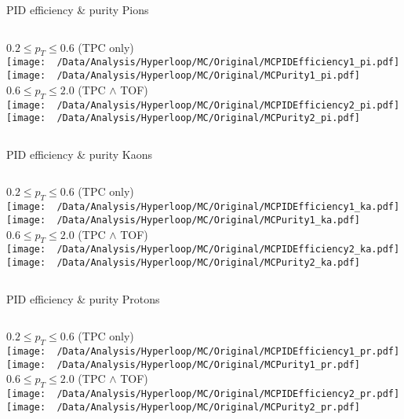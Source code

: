 \documentclass{beamer}
\begin{document}
\begin{frame}{PID efficiency \& purity}
	Pions\\
	\tiny
	\begin{columns}
		\centering
		$0.2\leq p_T \leq 0.6$ (TPC only)\\
		\texttt{[image: ~/Data/Analysis/Hyperloop/MC/Original/MCPIDEfficiency1\_pi.pdf]}\\
		\texttt{[image: ~/Data/Analysis/Hyperloop/MC/Original/MCPurity1\_pi.pdf]}
		\centering
		$0.6\leq p_T \leq 2.0$ (TPC $\land$ TOF)\\
		\texttt{[image: ~/Data/Analysis/Hyperloop/MC/Original/MCPIDEfficiency2\_pi.pdf]}\\
		\texttt{[image: ~/Data/Analysis/Hyperloop/MC/Original/MCPurity2\_pi.pdf]}
	\end{columns}
\end{frame}
\begin{frame}{PID efficiency \& purity}
	Kaons\\
	\tiny
	\begin{columns}
		\centering
		$0.2\leq p_T \leq 0.6$ (TPC only)\\
		\texttt{[image: ~/Data/Analysis/Hyperloop/MC/Original/MCPIDEfficiency1\_ka.pdf]}\\
		\texttt{[image: ~/Data/Analysis/Hyperloop/MC/Original/MCPurity1\_ka.pdf]}
		\centering
		$0.6\leq p_T \leq 2.0$ (TPC $\land$ TOF)\\
		\texttt{[image: ~/Data/Analysis/Hyperloop/MC/Original/MCPIDEfficiency2\_ka.pdf]}\\
		\texttt{[image: ~/Data/Analysis/Hyperloop/MC/Original/MCPurity2\_ka.pdf]}
	\end{columns}
\end{frame}
\begin{frame}{PID efficiency \& purity}
	Protons\\
	\tiny
	\begin{columns}
		\centering
		$0.2\leq p_T \leq 0.6$ (TPC only)\\
		\texttt{[image: ~/Data/Analysis/Hyperloop/MC/Original/MCPIDEfficiency1\_pr.pdf]}\\
		\texttt{[image: ~/Data/Analysis/Hyperloop/MC/Original/MCPurity1\_pr.pdf]}
		\centering
		$0.6\leq p_T \leq 2.0$ (TPC $\land$ TOF)\\
		\texttt{[image: ~/Data/Analysis/Hyperloop/MC/Original/MCPIDEfficiency2\_pr.pdf]}\\
		\texttt{[image: ~/Data/Analysis/Hyperloop/MC/Original/MCPurity2\_pr.pdf]}
	\end{columns}
\end{frame}
\end{document}
